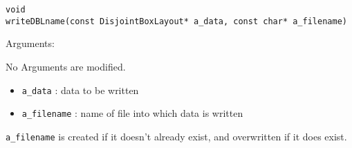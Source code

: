 \begin{verbatim}
void
writeDBLname(const DisjointBoxLayout* a_data, const char* a_filename)
\end{verbatim}  

Arguments:

No Arguments are modified.
\begin{itemize}
\item \verb|a_data| : data to be written
\item \verb|a_filename| : name of file into which data is written
\end{itemize}

\verb+a_filename+ is created if it doesn't already exist, and overwritten
if it does exist.  
